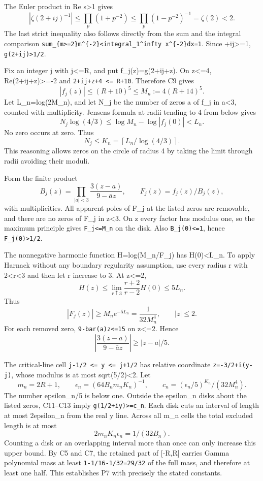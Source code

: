 The Euler product in Re s\textgreater1 gives \[
|\zeta(2+ij)^{-1}|\le\prod_p(1+p^{-2})
 \le\prod_p(1-p^{-2})^{-1}=\zeta(2)<2.
\] The last strict inequality also follows directly from the sum and the integral comparison \texttt{sum\_\{m\textgreater{}=2\}m\^{}\{-2\}\textless{}integral\_1\^{}infty\ x\^{}\{-2\}dx=1}. Since +ij\textbar\textgreater=1, \texttt{\textbar{}g(2+ij)\textbar{}\textgreater{}1/2}.

Fix an integer j with \textbar j\textbar\textless=R, and put f\_j(z)=g(2+ij+z). On \textbar z\textbar\textless=4, Re(2+ij+z)\textgreater=-2 and \texttt{\textbar{}2+ij+z\textbar{}+4\ \textless{}=\ R+10}. Therefore C9 gives \[
|f_j(z)|\le(R+10)^5\le M_n:=4(R+14)^5.
\tag{C10}
\] Let L\_n=log(2M\_n), and let N\_j be the number of zeros a of f\_j in \textbar a\textbar\textless3, counted with multiplicity. Jensen\textquotesingle s formula at radii tending to 4 from below gives \[
N_j\log(4/3)\le\log M_n-\log|f_j(0)|<L_n.
\] No zero occurs at zero. Thus \[
N_j\le K_n=\left\lceil L_n/\log(4/3)\right\rceil.
\tag{C11}
\] This reasoning allows zeros on the circle of radius 4 by taking the limit through radii avoiding their moduli.

Form the finite product \[
B_j(z)=\prod_{|a|<3}\frac{3(z-a)}{9-\bar a z},
\qquad F_j(z)=f_j(z)/B_j(z),
\] with multiplicities. All apparent poles of F\_j at the listed zeros are removable, and there are no zeros of F\_j in \textbar z\textbar\textless3. On \textbar z every factor has modulus one, so the maximum principle gives \texttt{\textbar{}F\_j\textbar{}\textless{}=M\_n} on the disk. Also \texttt{\textbar{}B\_j(0)\textbar{}\textless{}=1}, hence \texttt{\textbar{}F\_j(0)\textbar{}\textgreater{}1/2}.

The nonnegative harmonic function H=log(M\_n/\textbar F\_j\textbar) has H(0)\textless L\_n. To apply Harnack without any boundary regularity assumption, use every radius r with 2\textless r\textless3 and then let r increase to 3. At \textbar z\textbar\textless=2, \[
H(z)\le\lim_{r\uparrow3}\frac{r+2}{r-2}H(0)
 \le5L_n.
\] Thus \[
|F_j(z)|\ge M_ne^{-5L_n}=\frac1{32M_n^4},\qquad |z|\le2.
\tag{C12}
\] For each removed zero, \texttt{\textbar{}9-bar(a)z\textbar{}\textless{}=15} on \textbar z\textbar\textless=2. Hence \[
\left|\frac{3(z-a)}{9-\bar a z}\right|\ge|z-a|/5.
\tag{C13}
\]

The critical-line cell \texttt{j-1/2\ \textless{}=\ y\ \textless{}=\ j+1/2} has relative coordinate \texttt{z=-3/2+i(y-j)}, whose modulus is at most sqrt(5/2)\textless2. Let \[
m_n=2R+1,\qquad
\epsilon_n=(64B_nm_nK_n)^{-1},\qquad
c_n=(\epsilon_n/5)^{K_n}/(32M_n^4).
\] The number epsilon\_n/5 is below one. Outside the epsilon\_n disks about the listed zeros, C11--C13 imply \texttt{\textbar{}g(1/2+iy)\textbar{}\textgreater{}=c\_n}. Each disk cuts an interval of length at most 2epsilon\_n from the real y line. Across all m\_n cells the total excluded length is at most \[
2m_nK_n\epsilon_n=1/(32B_n).
\tag{C14}
\] Counting a disk or an overlapping interval more than once can only increase this upper bound. By C5 and C7, the retained part of {[}-R,R{]} carries Gamma polynomial mass at least \texttt{1-1/16-1/32=29/32} of the full mass, and therefore at least one half. This establishes P7 with precisely the stated constants.

